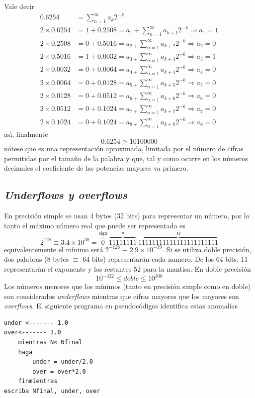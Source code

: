 \documentclass[spanish,titlepage,11pt]{article}
\begin{document}
Vale decir
\begin{align}
0.6254  &  =\sum_{n=1}^{\infty}a_{k}2^{-k}\\
2\times0.6254  &  =1+0.2508=a_{1}+\sum_{n=1}^{\infty}a_{k+1}2^{-k}%
\Longrightarrow a_{1}=1\\
2\times0.2508  &  =0+0.5016=a_{2+}\sum_{n=1}^{\infty}a_{k+2}2^{-k}%
\Longrightarrow a_{2}=0\\
2\times0.5016  &  =1+0.0032=a_{3+}\sum_{n=1}^{\infty}a_{k+3}2^{-k}%
\Longrightarrow a_{3}=1\\
2\times0.0032  &  =0+0.0064=a_{4+}\sum_{n=1}^{\infty}a_{k+4}2^{-k}%
\Longrightarrow a_{4}=0\\
2\times0.0064  &  =0+0.0128=a_{5+}\sum_{n=1}^{\infty}a_{k+5}2^{-k}%
\Longrightarrow a_{5}=0\\
2\times0.0128  &  =0+0.0512=a_{6+}\sum_{n=1}^{\infty}a_{k+6}2^{-k}%
\Longrightarrow a_{6}=0\\
2\times0.0512  &  =0+0.1024=a_{7+}\sum_{n=1}^{\infty}a_{k+7}2^{-k}%
\Longrightarrow a_{7}=0\\
2\times0.1024  &  =0+0.1024=a_{8+}\sum_{n=1}^{\infty}a_{k+8}2^{-k}%
\Longrightarrow a_{8}=0
\end{align}
as\'{\i}, finalmente
\begin{equation}
0.6254\simeq10100000
\end{equation}
n\'{o}tese que es una representaci\'{o}n aproximada, limitada por el
n\'{u}mero de cifras permitidas por el tama\~{n}o de la palabra y que, tal y
como ocurre en los n\'{u}meros decimales el coeficiente de las potencias
mayores va primero.

\subsection{\textit{Underflows y overflows}}

En precisi\'{o}n simple se usan 4 bytes (32 bits) para representar un
n\'{u}mero, por lo tanto el m\'{a}ximo n\'{u}mero real que puede ser
representado es
\begin{equation}
2^{128}\equiv3.4\times10^{38}=\overset{\operatorname*{sign}}{\overbrace{0}%
}\ \overset{p}{\overbrace{11111111}}\ \overset{M}{\overbrace
{11111111111111111111111}}%
\end{equation}
equivalentemente el m\'{i}nimo ser\'{a} $2^{-128}\equiv2.9\times10^{-39}.$ Si
se utiliza doble precisi\'{o}n, dos palabras (8 bytes $\equiv$ 64 bits)
representar\'{a}n cada numero. De los 64 bits, 11 representar\'{a}n el
exponente y los restantes 52 para la mantisa. En doble precisi\'{o}n
\begin{equation}
10^{-322}\leq doble\leq10^{308}%
\end{equation}
Los n\'{u}meros menores que los m\'{i}nimos (tanto en precisi\'{o}n simple
como en doble) son considerados \textit{underflows} mientras que cifras
mayores que los mayores son \textit{overflows}. El siguiente programa en
pseudoc\'{o}digos identifica estas anomal\'{i}as
\begin{verbatim}
under <------- 1.0
over<------- 1.0
    mientras N< Nfinal
    haga
        under = under/2.0
        over = over*2.0
    finmientras
escriba Nfinal, under, over
\end{verbatim}
\end{document}
